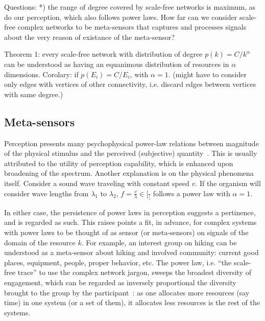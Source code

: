 \documentclass[a4paper, 11pt]{article} %
\begin{document}
Questions:
*) the range of degree covered by scale-free networks is maximum, as do our perception, which also follows power laws. How far can we consider scale-free complex networks to be meta-sensors that captures and processes signals about the very reason of existance of the meta-sensor?

Theorem 1: every scale-free network with distribution of degree $p(k)=C/k^\alpha$ can be understood as having an equanimous distribution of resources in $\alpha$ dimensions.
Corolary: if $p(E_i)=C/E_i$, with $\alpha=1$. (might have to consider only edges with vertices of other connectivity, i.e. discard edges between vertices with same degree.)

\subsection{Meta-sensors}
Perception presents many psychophysical power-law 
relations between
magnitude of the physical stimulus and the perceived 
(subjective) quantity~\cite{stev,web}.
This is usually attributed to the utility of perception capability,
which is enhanced upon broadening of the spectrum.
Another explanation is on the physical phenomena itself.
Consider a sound wave traveling with constant speed $v$.
If the organism will consider wave lengths from $\lambda_1$
to $\lambda_2$, $f=\frac{v}{\lambda} \in [\frac{}]$ follows
a power law with $\alpha=1$.

In either case, the persistence of power laws in perception
suggests a pertinence, and is regarded as such. This raises
points a fit, in advance, for complex systems with power laws
to be thought of as sensor (or meta-sensors) on signals
of the domain of the resource $k$.
For example, an interest group on hiking can be understood as
a meta-sensor about hiking and involved community: current good
places, equipment, people, proper behavior, etc.
The power law, i.e. ``the scale-free trace'' to use
the complex network jargon, sweeps the broadest 
diversity of engagement, which can be regarded as
inversely proportional the diversity brought to the group
by the participant~\cite{tStable}: 
as one allocates more resources (say time)
in one system (or a set of them),
it allocates less resources is the rest of the systems.
\end{document}
